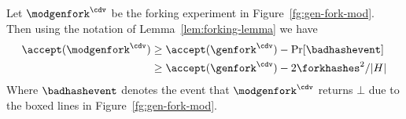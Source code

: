 \begin{corollary} \label{cor:modified-fork}
    Let $\modgenfork^\cdv$ be the forking experiment in Figure~\ref{fg:gen-fork-mod}.
    Then using the notation of Lemma~\ref{lem:forking-lemma} we have
    \begin{align} \label{eq:bound-mod-fork}
    \begin{split}
        \accept(\modgenfork^\cdv) & \geq \accept(\genfork^\cdv) - \Pr[\badhashevent]   \\
        & \geq \accept(\genfork^\cdv) - 2\forkhashes^2/\lvert H \rvert
    \end{split}
    \end{align}
    Where $\badhashevent$ denotes the event that $\modgenfork^\cdv$ returns $\bot$ due to the boxed lines in Figure~\ref{fg:gen-fork-mod}.
\end{corollary}



